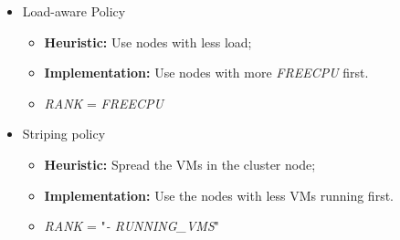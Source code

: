 \begin{itemize}
 \item Load-aware Policy
 \begin{itemize}
   \item \textbf{Heuristic:} Use nodes with less load;
   \item \textbf{Implementation:} Use nodes with more \textit{FREECPU} first.
    \item \textit{RANK} = \textit{FREECPU}

 \end{itemize}

  \item Striping policy
  \begin{itemize}
   \item \textbf{Heuristic:} Spread the VMs in the cluster node;
   \item \textbf{Implementation:} Use the nodes with less VMs running first.
   \item \textit{RANK} = "\textit{- RUNNING\_VMS}"
  \end{itemize}

\end{itemize}


